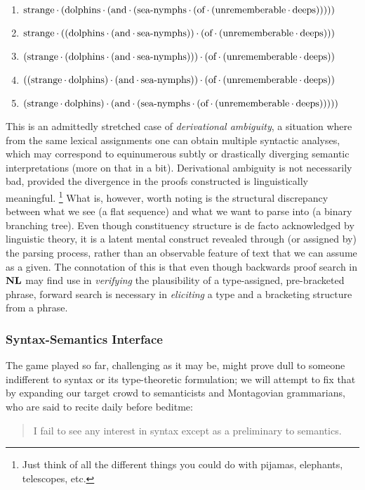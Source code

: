 {\smaller
\begin{enumerate}
\item $\text{strange}\mkern-0.5mu\cdot\mkern-0.5mu (\text{dolphins}\mkern-0.5mu\cdot\mkern-0.5mu (\text{and}\mkern-0.5mu\cdot\mkern-0.5mu (\text{sea-nymphs}\mkern-0.5mu\cdot\mkern-0.5mu (\text{of}\mkern-0.5mu\cdot\mkern-0.5mu (\text{unrememberable}\mkern-0.5mu\cdot\mkern-0.5mu \text{deeps})))))$
\item $\text{strange}\mkern-0.5mu\cdot\mkern-0.5mu ((\text{dolphins}\mkern-0.5mu\cdot\mkern-0.5mu (\text{and}\mkern-0.5mu\cdot\mkern-0.5mu \text{sea-nymphs}))\mkern-0.5mu\cdot\mkern-0.5mu (\text{of}\mkern-0.5mu\cdot\mkern-0.5mu (\text{unrememberable}\mkern-0.5mu\cdot\mkern-0.5mu \text{deeps})))$
\item $(\text{strange}\mkern-0.5mu\cdot\mkern-0.5mu (\text{dolphins}\mkern-0.5mu\cdot\mkern-0.5mu (\text{and}\mkern-0.5mu\cdot\mkern-0.5mu \text{sea-nymphs})))\mkern-0.5mu\cdot\mkern-0.5mu (\text{of}\mkern-0.5mu\cdot\mkern-0.5mu (\text{unrememberable}\mkern-0.5mu\cdot\mkern-0.5mu \text{deeps}))$
\item $((\text{strange}\mkern-0.5mu\cdot\mkern-0.5mu \text{dolphins})\mkern-0.5mu\cdot\mkern-0.5mu (\text{and}\mkern-0.5mu\cdot\mkern-0.5mu \text{sea-nymphs}))\mkern-0.5mu\cdot\mkern-0.5mu (\text{of}\mkern-0.5mu\cdot\mkern-0.5mu (\text{unrememberable}\mkern-0.5mu\cdot\mkern-0.5mu \text{deeps}))$
\item $(\text{strange}\mkern-0.5mu\cdot\mkern-0.5mu \text{dolphins})\mkern-0.5mu\cdot\mkern-0.5mu (\text{and}\mkern-0.5mu\cdot\mkern-0.5mu (\text{sea-nymphs}\mkern-0.5mu\cdot\mkern-0.5mu (\text{of}\mkern-0.5mu\cdot\mkern-0.5mu (\text{unrememberable}\mkern-0.5mu\cdot\mkern-0.5mu \text{deeps})))))$
\end{enumerate}
}
This is an admittedly stretched case of \textit{derivational ambiguity}, a situation where from the same lexical assignments one can obtain multiple syntactic analyses, which may correspond to equinumerous subtly or drastically diverging semantic interpretations (more on that in a bit).
Derivational ambiguity is not necessarily bad, provided the divergence in the proofs constructed is linguistically meaningful.%
\footnote{Just think of all the different things you could do with pijamas, elephants, telescopes, etc.}
What is, however, worth noting is the structural discrepancy between what we see (a flat sequence) and what we want to parse into (a binary branching tree).
Even though constituency structure is de facto acknowledged by linguistic theory, it is a latent mental construct revealed through (or assigned by) the parsing process, rather than an observable feature of text that we can assume as a given.
The connotation of this is that even though backwards proof search in $\textbf{NL}$ may find use in \textit{verifying} the plausibility of a type-assigned, pre-bracketed phrase, forward search is necessary in \textit{eliciting} a type and a bracketing structure from a phrase. 

\subsubsection{Syntax-Semantics Interface}\label{subsubsection:ssi_tlg}
The game played so far, challenging as it may be, might prove dull to someone indifferent to syntax or its type-theoretic formulation; we will attempt to fix that by expanding our target crowd to semanticists and Montagovian grammarians, who are said to recite daily before beditme:
\begin{quote}
I fail to see any interest in syntax except as a preliminary to semantics.~\cite{montague1970universal}
\end{quote}

